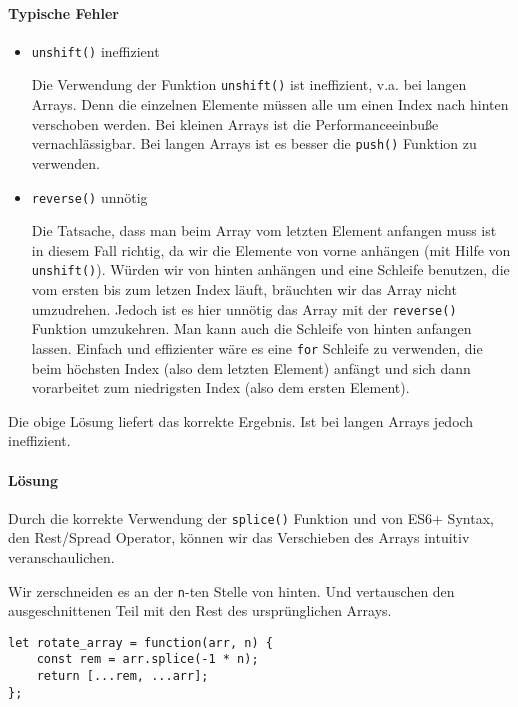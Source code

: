 \documentclass{book}
\begin{document}
\paragraph{Typische Fehler}
\begin{itemize} 
	\item \lstinline|unshift()| ineffizient
	
	Die Verwendung der Funktion \lstinline|unshift()| ist ineffizient, v.a. bei langen Arrays. Denn die einzelnen Elemente müssen alle um einen Index nach hinten verschoben werden. Bei kleinen Arrays ist die Performanceeinbuße vernachlässigbar. Bei langen Arrays ist es besser die \lstinline|push()| Funktion zu verwenden.
	
	\item \lstinline|reverse()| unnötig
	
	Die Tatsache, dass man beim Array vom letzten Element anfangen muss ist in diesem Fall richtig, da wir die Elemente von vorne anhängen (mit Hilfe von \lstinline|unshift()|). Würden wir von hinten anhängen und eine Schleife benutzen, die vom ersten bis zum letzen Index läuft, bräuchten wir das Array nicht umzudrehen. Jedoch ist es hier unnötig das Array mit der \lstinline|reverse()| Funktion umzukehren. Man kann auch die Schleife von hinten anfangen lassen. Einfach und effizienter wäre es eine \lstinline|for| Schleife zu verwenden, die beim höchsten Index (also dem letzten Element) anfängt und sich dann vorarbeitet zum niedrigsten Index (also dem ersten Element).
	
\end{itemize}

Die obige Lösung liefert das korrekte Ergebnis. Ist bei langen Arrays jedoch ineffizient.

\paragraph{Lösung} Durch die korrekte Verwendung der \lstinline|splice()| Funktion und von ES6+ Syntax, den Rest/Spread Operator, können wir das Verschieben des Arrays intuitiv veranschaulichen.

Wir zerschneiden es an der \lstinline|n|-ten Stelle von hinten. Und vertauschen den ausgeschnittenen Teil mit den Rest des ursprünglichen Arrays.

\begin{lstlisting}[caption=My Javascript Example]
let rotate_array = function(arr, n) {
	const rem = arr.splice(-1 * n);
	return [...rem, ...arr];
};
\end{lstlisting}
\end{document}
